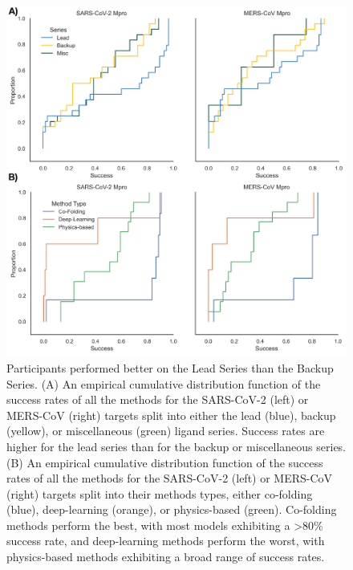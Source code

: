 \documentclass[journal=jcim,manuscript=article]{achemso}
\begin{document}
\begin{figure}
    \includegraphics[scale=1
    ]{04_figs_leaderboards/poses_by_series_and_method.png}
  \caption{Participants performed better on the Lead Series than the Backup Series. (A) An empirical cumulative distribution function of the success rates of all the methods for the SARS-CoV-2 (left) or MERS-CoV (right) targets split into either the lead (blue), backup (yellow), or miscellaneous (green) ligand series. Success rates are higher for the lead series than for the backup or miscellaneous series. (B) An empirical cumulative distribution function of the success rates of all the methods for the SARS-CoV-2 (left) or MERS-CoV (right) targets split into their methods types, either co-folding (blue), deep-learning (orange), or physics-based (green). Co-folding methods perform the best, with most models exhibiting a \textgreater 80\% success rate, and deep-learning methods perform the worst, with physics-based methods exhibiting a broad range of success rates.}
  \label{fgr:poses_by_series_and_method}
\end{figure}
\end{document}
